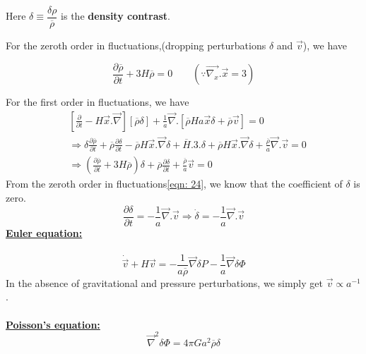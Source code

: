 \documentclass[a4,12pt,oneside]{report}
\begin{document}
	\begin{center}
		Here $ \delta \equiv \dfrac{\delta\rho}{\overline{\rho}} $ is the {\bf density contrast}.
	\end{center}
	
	For the zeroth order in fluctuations,(dropping perturbations $ \delta $ and $ \vec{v} $), we have
	
	\begin{equation}\label{eqn: 24}
	\frac{\partial \overline{\rho}}{\partial t} + 3H\overline{\rho} = 0         \quad\quad (\because \overrightarrow{\nabla_x}.\vec{x} = 3)
	\end{equation}
	
	For the first order in fluctuations, we have
	\begin{align}\label{key}
	&\left[\frac{\partial}{\partial t} - H\vec{x}.\overrightarrow{\nabla}\right][\overline{\rho}\delta] + \frac{1}{a}\overrightarrow{\nabla}.[\overline{\rho}Ha\vec{x}\delta + \overline{\rho}\vec{v}] = 0 \nonumber
	\\
	&\Rightarrow\delta\frac{\partial \overline{\rho}}{\partial t} + \overline{\rho}\frac{\partial \delta}{\partial t} - \overline{\rho}H\vec{x}.\overrightarrow{\nabla}\delta + \overline H.3.\delta + \overline{\rho} H \vec{x}. \overrightarrow{\nabla} \delta + \frac{\overline{\rho}}{a}\overrightarrow{\nabla}.\vec{v} = 0 \nonumber
	\\
	&\Rightarrow\left(\frac{\partial \overline{\rho}}{\partial t} + 3H\overline{\rho}\right)\delta + \overline{\rho}\frac{\partial \delta}{\partial t} + \frac{\overline{\rho}}{a}\vec{v} = 0 \nonumber
	\end{align}
	From the zeroth order in fluctuations\eqref{eqn: 24}, we know that the coefficient of $ \delta $ is zero. 
	\begin{equation}\label{continuity}
	\frac{\partial \delta}{\partial t} = -\frac{1}{a}\overrightarrow{\nabla}.\vec{v} \Rightarrow \dot{\delta} = -\frac{1}{a}\overrightarrow{\nabla}.\vec{v}
	\end{equation}
	{\bf \underline{Euler equation:}}
	\\ \\
	\begin{equation}\label{euler}
	\dot{\vec{v}} + H\vec{v} = -\frac{1}{a\overline{\rho}}\overrightarrow{\nabla}\delta P - \frac{1}{a}\overrightarrow{\nabla}\delta\Phi
	\end{equation}
	In the absence of gravitational and pressure perturbations, we simply get $ \vec{v}\propto a^{-1} $.
	\\ \\ {\bf \underline{Poisson's equation:}}
	\begin{equation}\label{poisson}
	\overrightarrow{\nabla}^2\delta \Phi = 4\pi Ga^2\overline{\rho}\delta
	\end{equation}
	
\end{document}
